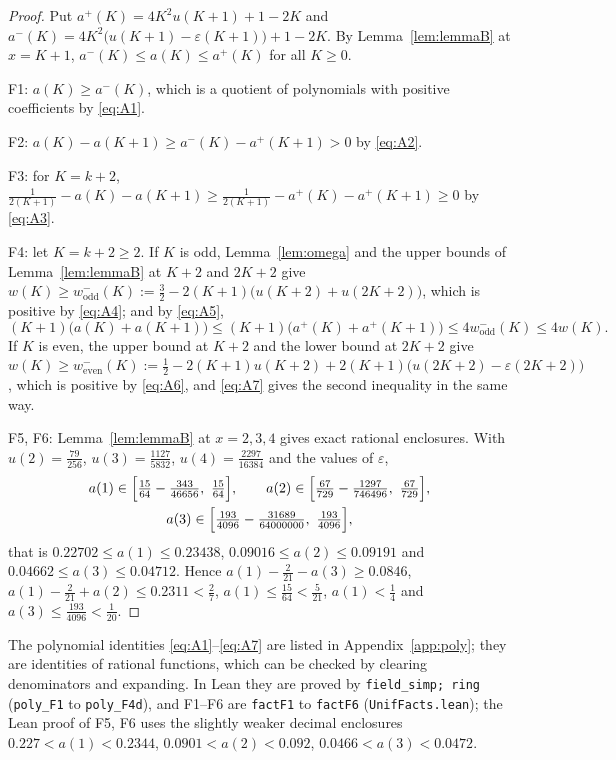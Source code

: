 \documentclass[11pt]{amsart}
\theoremstyle{definition}
\theoremstyle{remark}
\numberwithin{equation}{section}
\newcommand{\aup}{a^{+}}
\newcommand{\alo}{a^{-}}
\newcommand{\lean}[1]{\texttt{#1}}
\begin{document}
\begin{proof}
Put $\aup(K)=4K^2u(K+1)+1-2K$ and $\alo(K)=4K^2\bigl(u(K+1)-\varepsilon(K+1)\bigr)+1-2K$. By
Lemma~\ref{lem:lemmaB} at $x=K+1$, $\alo(K)\le a(K)\le\aup(K)$ for all $K\ge0$.

F1: $a(K)\ge\alo(K)$, which is a quotient of polynomials with positive coefficients by \eqref{eq:A1}.

F2: $a(K)-a(K+1)\ge\alo(K)-\aup(K+1)>0$ by \eqref{eq:A2}.

F3: for $K=k+2$, $\frac1{2(K+1)}-a(K)-a(K+1)\ge\frac1{2(K+1)}-\aup(K)-\aup(K+1)\ge0$ by \eqref{eq:A3}.

F4: let $K=k+2\ge2$. If $K$ is odd, Lemma~\ref{lem:omega} and the upper bounds of Lemma~\ref{lem:lemmaB}
at $K+2$ and $2K+2$ give $w(K)\ge w^-_{\mathrm{odd}}(K):=\frac32-2(K+1)\bigl(u(K+2)+u(2K+2)\bigr)$,
which is positive by \eqref{eq:A4}; and by \eqref{eq:A5},
\[
  (K+1)\bigl(a(K)+a(K+1)\bigr)\le(K+1)\bigl(\aup(K)+\aup(K+1)\bigr)\le4w^-_{\mathrm{odd}}(K)\le4w(K).
\]
If $K$ is even, the upper bound at $K+2$ and the lower bound at $2K+2$ give
$w(K)\ge w^-_{\mathrm{even}}(K):=\frac12-2(K+1)u(K+2)+2(K+1)\bigl(u(2K+2)-\varepsilon(2K+2)\bigr)$, which is
positive by \eqref{eq:A6}, and \eqref{eq:A7} gives the second inequality in the same way.

F5, F6: Lemma~\ref{lem:lemmaB} at $x=2,3,4$ gives exact rational enclosures. With
$u(2)=\frac{79}{256}$, $u(3)=\frac{1127}{5832}$, $u(4)=\frac{2297}{16384}$ and the values of $\varepsilon$,
\begin{gather*}
  a(1)\in\Bigl[\tfrac{15}{64}-\tfrac{343}{46656},\ \tfrac{15}{64}\Bigr],\qquad
  a(2)\in\Bigl[\tfrac{67}{729}-\tfrac{1297}{746496},\ \tfrac{67}{729}\Bigr],\\
  a(3)\in\Bigl[\tfrac{193}{4096}-\tfrac{31689}{64000000},\ \tfrac{193}{4096}\Bigr],
\end{gather*}
that is $0.22702\le a(1)\le0.23438$, $0.09016\le a(2)\le0.09191$ and $0.04662\le a(3)\le0.04712$. Hence
$a(1)-\frac2{21}-a(3)\ge0.0846$, $a(1)-\frac2{21}+a(2)\le0.2311<\frac27$, $a(1)\le\frac{15}{64}<\frac5{21}$,
$a(1)<\frac14$ and $a(3)\le\frac{193}{4096}<\frac1{20}$.
\end{proof}

The polynomial identities \eqref{eq:A1}--\eqref{eq:A7} are listed in Appendix~\ref{app:poly}; they are
identities of rational functions, which can be checked by clearing denominators and expanding. In
Lean they are proved by \lean{field\_simp; ring} (\lean{poly\_F1} to \lean{poly\_F4d}), and F1--F6 are
\lean{factF1} to \lean{factF6} (\lean{UnifFacts.lean}); the Lean proof of F5, F6 uses the slightly weaker
decimal enclosures $0.227<a(1)<0.2344$, $0.0901<a(2)<0.092$, $0.0466<a(3)<0.0472$.
\end{document}
